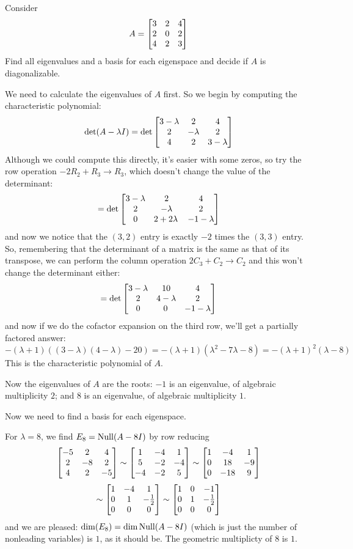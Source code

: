 \begin{myprob} Consider 
$$
A = \left[ \begin{matrix} 3 & 2 & 4\\ 2& 0 & 2\\ 4 & 2 & 3 \end{matrix} \right]
$$
Find all eigenvalues and a basis for each eigenspace and decide
if $A$ is diagonalizable.

\begin{mysol}  We need to calculate the eigenvalues of $A$ first.  So
we begin by computing the characteristic polynomial:
$$
\det( A-\lambda I) = 
\det \left[ \begin{matrix} 
3-\lambda & 2      & 4 \\ 
2          & -\lambda & 2 \\ 
4          & 2      &  3-\lambda  \end{matrix} \right]
$$
Although we could compute this directly, it's easier with
some zeros, so try the row operation $-2 R_2  + R_3 \to R_3$, which doesn't change
the value of the determinant:
$$
= \det \left[ \begin{matrix} 
3-\lambda & 2      & 4 \\ 
2          & -\lambda & 2 \\ 
0          & 2+2 \lambda \,     &  - 1 -\lambda \end{matrix} \right]
$$
and now we notice that the $(3,2)$ entry is exactly $-2$ times the
$(3,3)$ entry.  So, remembering that the determinant of a
matrix is the same as that of its transpose, we can perform the column operation
$2C_3+C_2\to C_2$ and this won't change the determinant either:
$$
=  \det \left[ \begin{matrix} 
3-\lambda & 10      & 4 \\ 
2          & 4-\lambda & 2 \\ 
0          & 0 \,     &  - 1 -\lambda \end{matrix} \right]
$$
and now if we do the cofactor expansion on the third row, we'll
get a partially factored answer:
$$
-(\lambda + 1) \left( (3-\lambda)(  4-\lambda) - 20 \right) = -(\lambda + 1)(\lambda^2 - 7 \lambda -8) = -(\lambda+1)^2(\lambda - 8)
$$
This is the characteristic polynomial of $A$.

Now the eigenvalues of $A$ are the roots:  $-1$ is an eigenvalue,
of algebraic multiplicity $2$; and $8$ is an eigenvalue, of 
algebraic multiplicity $1$.

Now we need to find a basis for each eigenspace.

For $\lambda = 8$, we find $E_8 = \operatorname{Null}(A-8I)$ by row reducing
$$
\left[ \begin{matrix} -5 &  2      & 4 \\ 
2          & -8 & 2 \\ 
4          & 2      & -5 \end{matrix} \right]
\sim  
\left[ \begin{matrix} 
1 & -4 & 1\\
5 & -2 & -4\\
-4 & -2 & 5 \end{matrix} \right]
\sim
\left[ \begin{matrix} 
1 & -4 & 1\\
0 & 18 & -9\\
0 & -18 & 9 \end{matrix} \right]
$$
$$
\sim \left[ \begin{matrix} 1 & -4 & 1\\
0 & 1 & -\frac12 \\
0 & 0 & 0 \end{matrix} \right]
\sim
\left[ \begin{matrix} 1 & 0 & -1\\ 0 & 1 & -\frac12 \\ 0 & 0 & 0 \end{matrix} \right]
$$
and we are pleased:  $\dim(E_8)=\dim \operatorname{Null}(A-8I) $ (which is just the
number of nonleading variables) is $1$, as it should be.  The
geometric multiplicty of $8$ is $1$.


\end{mysol}
\end{myprob}
